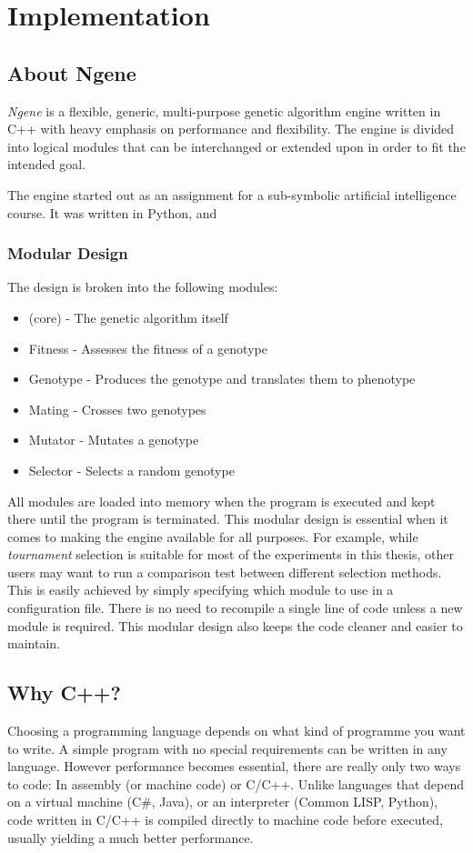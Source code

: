 \section{Implementation}

\subsection{About Ngene}
\emph{Ngene} is a flexible, generic, multi-purpose genetic algorithm engine written in C++ with heavy emphasis on performance and flexibility. The engine is divided into logical modules that can be interchanged or extended upon in order to fit the intended goal.

The engine started out as an assignment for a sub-symbolic artificial intelligence course. It was written in Python, and 

\subsubsection{Modular Design}
The design is broken into the following modules:

\begin{itemize}
	\item (core) - The genetic algorithm itself
	\item Fitness - Assesses the fitness of a genotype
	\item Genotype - Produces the genotype and translates them to phenotype
	\item Mating - Crosses two genotypes
	\item Mutator - Mutates a genotype
	\item Selector - Selects a random genotype
\end{itemize}

All modules are loaded into memory when the program is executed and kept there until the program is terminated. This modular design is essential when it comes to making the engine available for all purposes. For example, while \emph{tournament} selection is suitable for most of the experiments in this thesis, other users may want to run a comparison test between different selection methods. This is easily achieved by simply specifying which module to use in a configuration file. There is no need to recompile a single line of code unless a new module is required. This modular design also keeps the code cleaner and easier to maintain.

\subsection{Why C++?}
Choosing a programming language depends on what kind of programme you want to write. A simple program with no special requirements can be written in any language. However performance becomes essential, there are really only two ways to code: In assembly (or machine code) or C/C++. Unlike languages that depend on a virtual machine (C\#, Java), or an interpreter (Common LISP, Python), code written in C/C++ is compiled directly to machine code before executed, usually yielding a much better performance.

